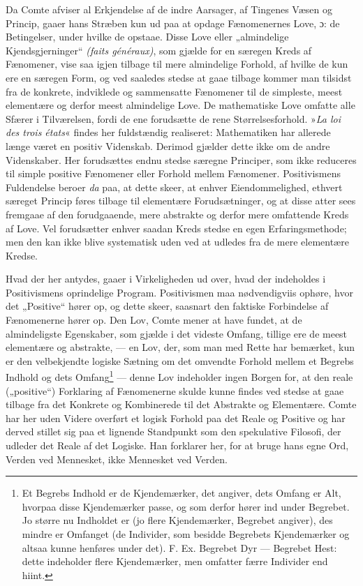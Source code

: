 \documentclass[12pt,a4paper,openany]{book}
\newcommand{\opage}[1]{\marginnote{\footnotesize\textit{[#1]}}}
\begin{document}
Da Comte afviser al Erkjendelse af de indre Aarsager,
af Tingenes Væsen og Princip, gaaer hans Stræben kun
ud paa at opdage Fænomenernes Love, ɔ: de Betingelser,
under hvilke de opstaae. Disse Love eller „almindelige
Kjendsgjerninger“ \textit{(faits généraux)}, som gjælde for en særegen
Kreds af Fænomener, vise saa igjen tilbage til mere
almindelige Forhold, af hvilke de kun ere en særegen Form,
og ved saaledes stedse at gaae tilbage kommer man tilsidst
fra de konkrete, indviklede og sammensatte Fænomener til de
simpleste, meest elementære og derfor meest almindelige Love.
De mathematiske Love omfatte alle Sfærer i Tilværelsen,
fordi de ene forudsætte de rene Størrelsesforhold. »\textit{La loi
des trois états}« findes her fuldstændig realiseret: Mathematiken
har allerede længe været en positiv Videnskab. Derimod
gjælder dette ikke om de andre Videnskaber. Her forudsættes
endnu stedse særegne Principer, som ikke reduceres
til simple positive Fænomener eller Forhold mellem Fænomener.
Positivismens Fuldendelse beroer \emph{da} paa, at dette
skeer, at enhver Eiendommelighed, ethvert særeget Princip
føres tilbage til elementære Forudsætninger, og at disse atter
sees fremgaae af den forudgaaende, mere abstrakte og derfor
mere omfattende Kreds af Love. Vel forudsætter enhver
saadan Kreds stedse en egen Erfaringsmethode; men den
kan ikke blive systematisk uden ved at udledes fra de mere
elementære Kredse.

Hvad der her antydes, gaaer i Virkeligheden ud over,
hvad der indeholdes i Positivismens oprindelige Program.
Positivismen maa nødvendigviis ophøre, hvor det „Positive“
hører op, og dette skeer, saasnart den faktiske Forbindelse af
Fænomenerne hører op. Den Lov, Comte mener at have
fundet, at de almindeligste Egenskaber, som gjælde i det
videste Omfang, tillige ere de meest elementære og abstrakte, ---
en Lov, der, som man med Rette har bemærket, kun er den
velbekjendte logiske Sætning om det omvendte Forhold mellem
\opage{203}et Begrebs Indhold og dets Omfang\footnote{Et Begrebs Indhold er de Kjendemærker, det angiver, dets Omfang er Alt, hvorpaa disse Kjendemærker passe, og som derfor hører ind under Begrebet. Jo større nu Indholdet er (jo flere Kjendemærker, Begrebet angiver), des mindre er Omfanget (de Individer, som besidde Begrebets Kjendemærker og altsaa kunne henføres under det). F. Ex. Begrebet Dyr --- Begrebet Hest: dette indeholder flere Kjendemærker, men omfatter færre Individer end hiint.} --- denne Lov indeholder
ingen Borgen for, at den reale („positive“) Forklaring
af Fænomenerne skulde kunne findes ved stedse at gaae tilbage
fra det Konkrete og Kombinerede til det Abstrakte og
Elementære. Comte har her uden Videre overført et logisk
Forhold paa det Reale og Positive og har derved stillet sig
paa et lignende Standpunkt som den spekulative Filosofi, der
udleder det Reale af det Logiske. Han forklarer her, for at
bruge hans egne Ord, Verden ved Mennesket, ikke Mennesket
ved Verden.
\end{document}
